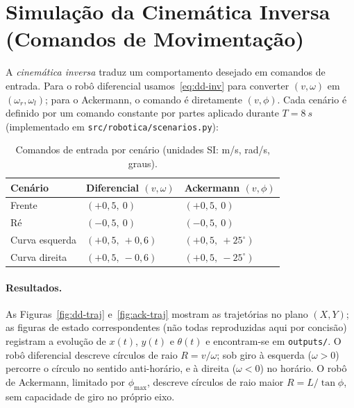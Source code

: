 \documentclass[11pt,a4paper]{article}
\begin{document}
\section{Simulação da Cinemática Inversa (Comandos de Movimentação)}

A \emph{cinemática inversa} traduz um comportamento desejado em comandos de
entrada. Para o robô diferencial usamos~\eqref{eq:dd-inv} para converter
$(v,\omega)$ em $(\omega_r,\omega_l)$; para o Ackermann, o comando é
diretamente $(v,\phi)$. Cada cenário é definido por um comando constante por
partes aplicado durante $T=\SI{8}{s}$ (implementado em
\texttt{src/robotica/scenarios.py}):

\begin{table}[H]
  \centering
  \begin{tabular}{lll}
    \toprule
    \textbf{Cenário} & \textbf{Diferencial} $(v,\omega)$ & \textbf{Ackermann} $(v,\phi)$ \\
    \midrule
    Frente          & $(+0{,}5,\ 0)$      & $(+0{,}5,\ 0)$ \\
    Ré              & $(-0{,}5,\ 0)$      & $(-0{,}5,\ 0)$ \\
    Curva esquerda  & $(+0{,}5,\ +0{,}6)$ & $(+0{,}5,\ +25^\circ)$ \\
    Curva direita   & $(+0{,}5,\ -0{,}6)$ & $(+0{,}5,\ -25^\circ)$ \\
    \bottomrule
  \end{tabular}
  \caption{Comandos de entrada por cenário (unidades SI: \si{m/s}, \si{rad/s}, graus).}
\end{table}

\paragraph{Resultados.} As Figuras~\ref{fig:dd-traj} e~\ref{fig:ack-traj}
mostram as trajetórias no plano $(X,Y)$; as figuras de estado
correspondentes (não todas reproduzidas aqui por concisão) registram a
evolução de $x(t)$, $y(t)$ e $\theta(t)$ e encontram-se em
\texttt{outputs/}. O robô diferencial descreve círculos de raio
$R=v/\omega$; sob giro à esquerda ($\omega>0$) percorre o círculo no sentido
anti-horário, e à direita ($\omega<0$) no horário. O robô de Ackermann,
limitado por $\phi_{\max}$, descreve círculos de raio maior
$R=L/\tan\phi$, sem capacidade de giro no próprio eixo.
\end{document}
